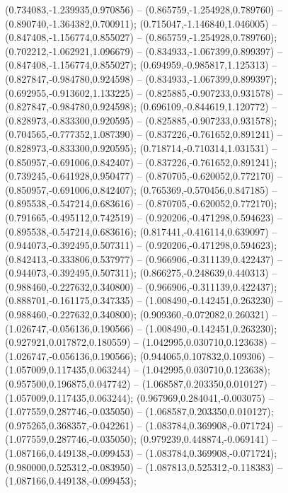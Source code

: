  (0.734083,-1.239935,0.970856) -- (0.865759,-1.254928,0.789760) -- (0.890740,-1.364382,0.700911);
 (0.715047,-1.146840,1.046005) -- (0.847408,-1.156774,0.855027) -- (0.865759,-1.254928,0.789760);
 (0.702212,-1.062921,1.096679) -- (0.834933,-1.067399,0.899397) -- (0.847408,-1.156774,0.855027);
 (0.694959,-0.985817,1.125313) -- (0.827847,-0.984780,0.924598) -- (0.834933,-1.067399,0.899397);
 (0.692955,-0.913602,1.133225) -- (0.825885,-0.907233,0.931578) -- (0.827847,-0.984780,0.924598);
 (0.696109,-0.844619,1.120772) -- (0.828973,-0.833300,0.920595) -- (0.825885,-0.907233,0.931578);
 (0.704565,-0.777352,1.087390) -- (0.837226,-0.761652,0.891241) -- (0.828973,-0.833300,0.920595);
 (0.718714,-0.710314,1.031531) -- (0.850957,-0.691006,0.842407) -- (0.837226,-0.761652,0.891241);
 (0.739245,-0.641928,0.950477) -- (0.870705,-0.620052,0.772170) -- (0.850957,-0.691006,0.842407);
 (0.765369,-0.570456,0.847185) -- (0.895538,-0.547214,0.683616) -- (0.870705,-0.620052,0.772170);
 (0.791665,-0.495112,0.742519) -- (0.920206,-0.471298,0.594623) -- (0.895538,-0.547214,0.683616);
 (0.817441,-0.416114,0.639097) -- (0.944073,-0.392495,0.507311) -- (0.920206,-0.471298,0.594623);
 (0.842413,-0.333806,0.537977) -- (0.966906,-0.311139,0.422437) -- (0.944073,-0.392495,0.507311);
 (0.866275,-0.248639,0.440313) -- (0.988460,-0.227632,0.340800) -- (0.966906,-0.311139,0.422437);
 (0.888701,-0.161175,0.347335) -- (1.008490,-0.142451,0.263230) -- (0.988460,-0.227632,0.340800);
 (0.909360,-0.072082,0.260321) -- (1.026747,-0.056136,0.190566) -- (1.008490,-0.142451,0.263230);
 (0.927921,0.017872,0.180559) -- (1.042995,0.030710,0.123638) -- (1.026747,-0.056136,0.190566);
 (0.944065,0.107832,0.109306) -- (1.057009,0.117435,0.063244) -- (1.042995,0.030710,0.123638);
 (0.957500,0.196875,0.047742) -- (1.068587,0.203350,0.010127) -- (1.057009,0.117435,0.063244);
 (0.967969,0.284041,-0.003075) -- (1.077559,0.287746,-0.035050) -- (1.068587,0.203350,0.010127);
 (0.975265,0.368357,-0.042261) -- (1.083784,0.369908,-0.071724) -- (1.077559,0.287746,-0.035050);
 (0.979239,0.448874,-0.069141) -- (1.087166,0.449138,-0.099453) -- (1.083784,0.369908,-0.071724);
 (0.980000,0.525312,-0.083950) -- (1.087813,0.525312,-0.118383) -- (1.087166,0.449138,-0.099453);
